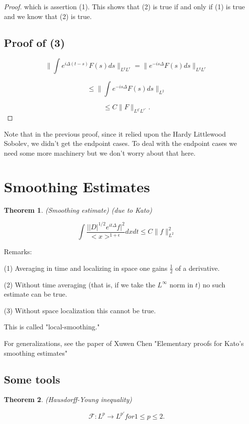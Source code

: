 \documentclass[11pt]{amsart}
\theoremstyle{plain}
\numberwithin{equation}{section}
\newtheorem{thm}{Theorem}[section]
\theoremstyle{remark}
\begin{document}
\begin{proof}
which is assertion (1). This shows that (2) is true if and only if (1) is true and we know that (2) is true.

\subsection{Proof of (3)} 

$$\| \int e^{i\Delta(t-s)} F(s) ds \|_{L^q L^r} = \| e^{-is\Delta} F(s) ds \|_{L^q L^r}$$

$$\leq \| \int e^{-is\Delta} F(s) ds \|_{L^2}$$

$$\leq C \| F \|_{L^{q'}L^{r'}}.$$

\end{proof}

Note that in the previous proof, since it relied upon the Hardy Littlewood Sobolev, we didn't get the endpoint cases. To deal with the endpoint cases we need some more machinery but we don't worry about that here. 

\section{Smoothing Estimates}

\begin{thm} (Smoothing estimate) (due to Kato)

$$\int \frac{ \big | |D|^{1/2} e^{it\Delta} f \big |^2}{<x>^{1+\epsilon}}dxdt \leq C\| f \|_{L^2}^2$$


\end{thm}

Remarks: 

(1) Averaging in time and localizing in space one gains $\frac{1}{2}$ of a derivative. 

(2) Without time averaging (that is, if we take the $L^\infty$ norm in $t$) no such estimate can be true. 

(3) Without space localization this cannot be true. 

This is called "local-smoothing."

For generalizations, see the paper of Xuwen Chen "Elementary proofs for Kato's smoothing estimates"

\subsection{Some tools}

\begin{thm} (Hausdorff-Young inequality)

$$\mathcal{F} : L^p \rightarrow L^{p'} for 1\leq p \leq 2. $$

\end{thm}
\end{document}

